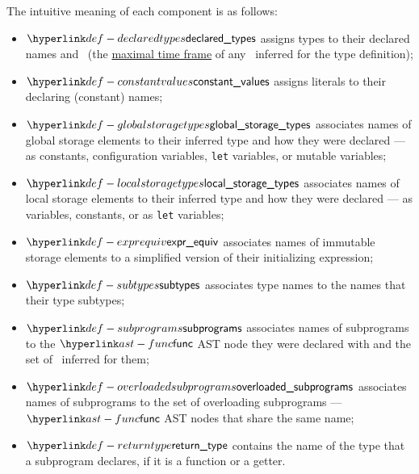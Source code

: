 The intuitive meaning of each component is as follows:
\begin{itemize}
  \hypertarget{def-declaredtypes}{}
  \item $\declaredtypes$ assigns types to their declared names and \timeframeterm\
  (the \hyperlink{def-maxtimeframe}{maximal time frame} of any \sideeffectdescriptorterm\ inferred for
  the type definition);
  \hypertarget{def-constantvalues}{}
  \item $\constantvalues$ assigns literals to their declaring (constant) names;
  \hypertarget{def-globalstoragetypes}{}
  \item $\globalstoragetypes$ associates names of global storage elements to their inferred type
  and how they were declared --- as constants, configuration variables, \texttt{let} variables,
  or mutable variables;
  \hypertarget{def-localstoragetypes}{}
  \item $\localstoragetypes$ associates names of local storage elements to their inferred type
  and how they were declared --- as variables, constants, or as \texttt{let} variables;
  \hypertarget{def-exprequiv}{}
  \item $\exprequiv$ associates names of immutable storage elements to a simplified version
  of their initializing expression;
  \hypertarget{def-subtypes}{}
  \item $\subtypes$ associates type names to the names that their type subtypes;
  \hypertarget{def-subprograms}{}
  \item $\subprograms$ associates names of subprograms to the $\func$ AST node they were
  declared with and the set of \sideeffectdescriptorsterm\ inferred for them;
  \hypertarget{def-overloadedsubprograms}{}
  \item $\overloadedsubprograms$ associates names of subprograms to the set of overloading
  subprograms ---  $\func$ AST nodes that share the same name;
  \hypertarget{def-returntype}{}
  \item $\returntype$ contains the name of the type that a subprogram declares, if it is
  a function or a getter.
\end{itemize}

